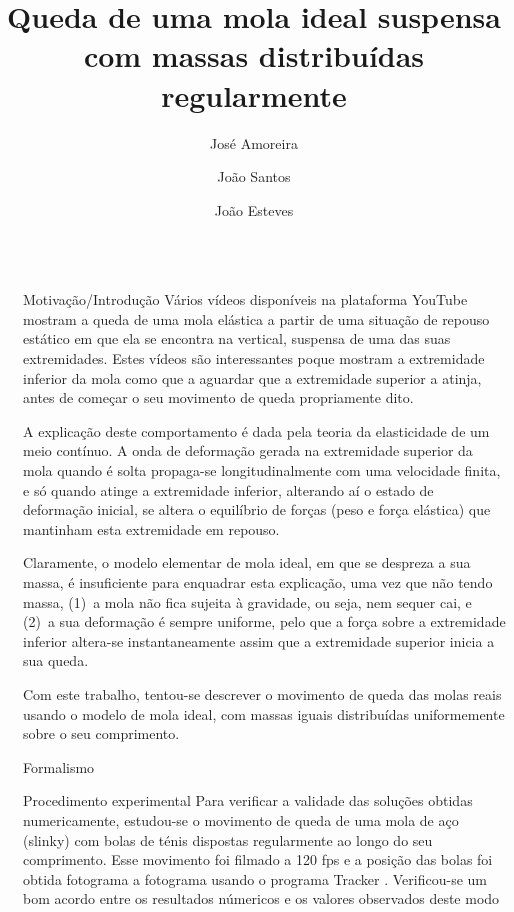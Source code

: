 \documentclass[final]{beamer}
\title{Queda de uma mola ideal suspensa com massas distribuídas regularmente}
\author{José Amoreira \inst{1,2,3} \and João Santos \inst{2} \and João Esteves \inst{2}}
\institute[]{\inst{1} Laboratório de Instrumentação e Física Experimental de Partículas \and  \inst{2}Universidade da Beira Interior  \samelineand \inst{3} Centro de Matemática e Aplicações}
\newlength{\sepwidth}
\newlength{\colwidth}
\newcommand{\separatorcolumn}{\begin{column}{\sepwidth}\end{column}}
\begin{document}
\begin{frame}[t]
\begin{columns}[t]
\separatorcolumn
\begin{column}{\colwidth}
\begin{exampleblock}{Motivação/Introdução}
	Vários vídeos disponíveis na plataforma YouTube mostram a queda de uma mola
	elástica a partir de uma situação de repouso estático em que ela se encontra na
	vertical, suspensa de uma das suas extremidades. Estes vídeos são interessantes
	poque mostram a extremidade inferior da mola como que a aguardar que a
	extremidade superior a atinja, antes de começar o seu movimento de queda
	propriamente dito. 
	
	A explicação deste comportamento é dada pela teoria da elasticidade de um meio
	contínuo. A onda de deformação gerada na extremidade superior da mola quando é
	solta propaga-se longitudinalmente com uma velocidade finita, e só quando atinge
	a extremidade inferior, alterando aí o estado de deformação inicial, se altera o
	equilíbrio de forças (peso e força elástica) que mantinham esta extremidade em
	repouso.
	
	Claramente, o modelo elementar de mola ideal, em que se despreza a sua massa, é
	insuficiente para enquadrar esta explicação, uma vez que não tendo massa, (1)~a
	mola não fica sujeita à gravidade, ou seja, nem sequer cai, e (2)~a sua deformação é
	sempre uniforme, pelo que a força sobre a extremidade inferior altera-se
	instantaneamente assim que a extremidade superior inicia a sua queda. 
	
	Com este trabalho, tentou-se descrever o movimento de queda das molas reais
	usando o modelo de mola ideal, com massas iguais distribuídas uniformemente
	sobre o seu comprimento.
\end{exampleblock}
\begin{block}{Formalismo}
	\vspace{1cm}
	
\end{block}
\begin{block}{Procedimento experimental}
	Para verificar a validade das soluções obtidas numericamente, estudou-se o movimento de queda de uma mola de aço (slinky) com bolas de ténis dispostas regularmente ao longo do seu comprimento. Esse movimento foi filmado a 120 fps e a posição das bolas foi obtida fotograma a fotograma usando o programa Tracker \cite{Tracker}. Verificou-se um bom acordo entre os resultados númericos e os valores observados deste modo 


\end{block}
\end{column}
\end{columns}
\end{frame}
\end{document}
